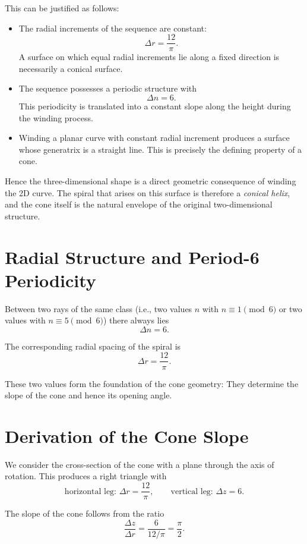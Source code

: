 This can be justified as follows:

\begin{itemize}
  \item The radial increments of the sequence are constant:
  \[
  \Delta r = \frac{12}{\pi}.
  \]
  A surface on which equal radial increments lie along a fixed direction
  is necessarily a conical surface.

  \item The sequence possesses a periodic structure with
  \[
  \Delta n = 6.
  \]
  This periodicity is translated into a constant slope along the
  height during the winding process.

  \item Winding a planar curve with constant radial increment produces
  a surface whose generatrix is a straight line. This is precisely the defining
  property of a cone.
\end{itemize}

Hence the three-dimensional shape is a direct geometric consequence of winding the 2D curve. The spiral that arises on this surface is therefore a \emph{conical helix}, and the cone
itself is the natural envelope of the original two-dimensional structure.

\section{Radial Structure and Period-6 Periodicity}

Between two rays of the same class (i.e., two values $n$ with
$n \equiv 1 \pmod{6}$ or two values with $n \equiv 5 \pmod{6}$) there always lies
\[
\Delta n = 6.
\]

The corresponding radial spacing of the spiral is
\[
\Delta r = \frac{12}{\pi}.
\]

These two values form the foundation of the cone geometry: They determine the
slope of the cone and hence its opening angle.

\section{Derivation of the Cone Slope}

We consider the cross-section of the cone with a plane through the axis of rotation.
This produces a right triangle with
\[
\text{horizontal leg: } \Delta r = \frac{12}{\pi}, \qquad
\text{vertical leg: } \Delta z = 6.
\]

The slope of the cone follows from the ratio
\[
\frac{\Delta z}{\Delta r}
= \frac{6}{12/\pi}
= \frac{\pi}{2}.
\]

